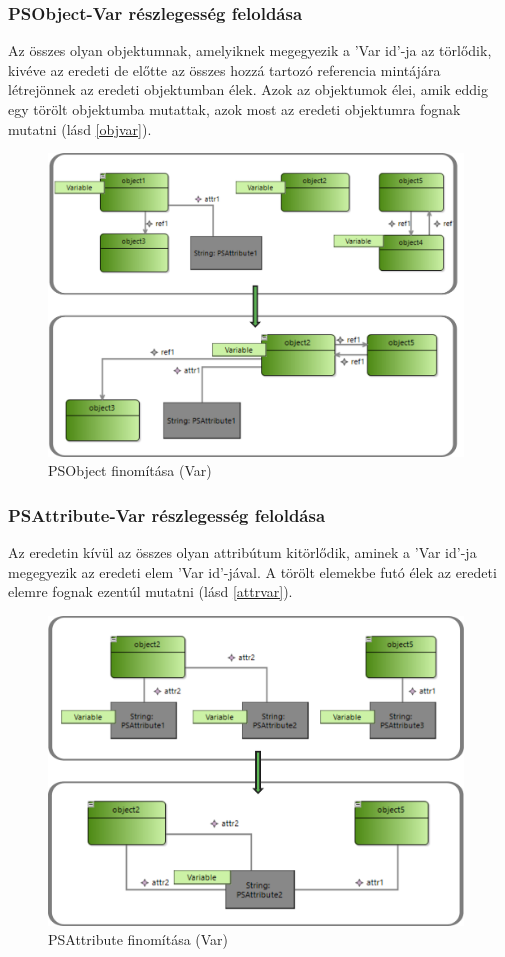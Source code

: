 \subsubsection{PSObject-Var részlegesség feloldása}
 Az összes olyan objektumnak, amelyiknek megegyezik a 'Var id'-ja az törlődik, kivéve az eredeti de előtte az összes hozzá tartozó referencia mintájára létrejönnek az eredeti objektumban élek. Azok az objektumok élei, amik eddig egy törölt objektumba mutattak, azok most az eredeti objektumra fognak mutatni (lásd \autoref{objvar}).
\begin{figure}[!ht]
	\centering
	\includegraphics[width=110mm]{figures/objvar.pdf}
	\caption{PSObject finomítása (Var)}
	\label{objvar} 
\end{figure}

\subsubsection{PSAttribute-Var részlegesség feloldása}
Az eredetin kívül az összes olyan attribútum kitörlődik, aminek a 'Var id'-ja megegyezik az eredeti elem 'Var id'-jával. A törölt elemekbe futó élek az eredeti elemre fognak ezentúl mutatni (lásd \autoref{attrvar}).
\begin{figure}[!ht]
	\centering
	\includegraphics[width=110mm]{figures/attrvar.pdf}
	\caption{PSAttribute finomítása (Var)}
	\label{attrvar} 
\end{figure}

